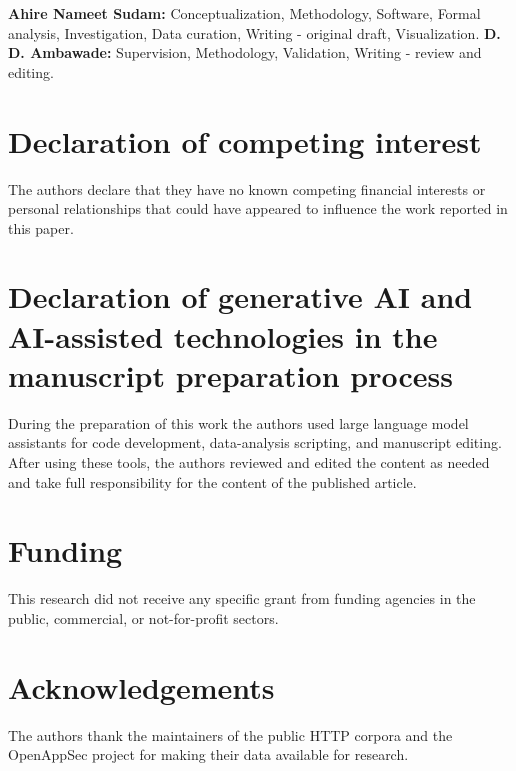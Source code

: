 \documentclass[preprint,11pt]{elsarticle}
\begin{document}
\textbf{Ahire Nameet Sudam:} Conceptualization, Methodology, Software,
Formal analysis, Investigation, Data curation, Writing - original draft,
Visualization. \textbf{D. D. Ambawade:} Supervision, Methodology,
Validation, Writing - review and editing.

\section*{Declaration of competing
interest}\label{declaration-of-competing-interest}

The authors declare that they have no known competing financial
interests or personal relationships that could have appeared to
influence the work reported in this paper.

\section*{Declaration of generative AI and AI-assisted technologies in
the manuscript preparation
process}\label{declaration-of-generative-ai-and-ai-assisted-technologies-in-the-manuscript-preparation-process}

During the preparation of this work the authors used large language
model assistants for code development, data-analysis scripting, and
manuscript editing. After using these tools, the authors reviewed and
edited the content as needed and take full responsibility for the
content of the published article.

\section*{Funding}\label{funding}

This research did not receive any specific grant from funding agencies
in the public, commercial, or not-for-profit sectors.

\section*{Acknowledgements}\label{acknowledgements}

The authors thank the maintainers of the public HTTP corpora and the
OpenAppSec project for making their data available for research.



\end{document}
